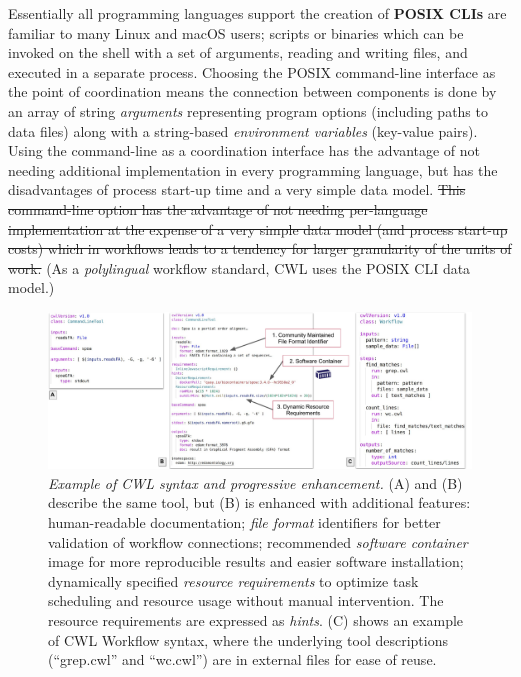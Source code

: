 \documentclass[sigconf,revew,screen,timestamp,nonacm]{acmart}
\newcommand{\addition}[1]{{\color{brown} #1}}
\newcommand{\deletion}[1]{{\color{red} \sout{#1}}}
\begin{document}
Essentially all programming languages support the creation of \textbf{POSIX CLIs} \addition{are familiar} to many Linux and macOS users; scripts or binaries which can be invoked on the shell with a set of arguments, reading and writing files, and executed in a separate process. Choosing the POSIX command-line interface as the point of coordination means the connection between components is done by an array of string \textit{arguments} representing program options (including paths to data files) along with a string-based \textit{environment variables} (key-value pairs). \addition{Using the command-line as a coordination interface has the advantage of not needing additional implementation in every programming language, but has the disadvantages of process start-up time and a very simple data model.} \deletion{This command-line option has the advantage of not needing per-language implementation at the expense of a very simple data model (and process start-up costs) which in workflows leads to a tendency for larger granularity of the units of work.} (As a \textit{polylingual} workflow standard, CWL uses the POSIX CLI data model.)

\begin{figure}
  \centering
  \includegraphics[width=\textwidth]{figure3b}
  \caption{\emph{Example of CWL syntax and progressive enhancement.} (A) and (B) describe the same tool, but (B) is enhanced with additional features:
  human-readable documentation;
  \textit{file format} identifiers \addition{for better}
  validation of workflow connections;
  recommended \textit{software container} image for more reproducible results and easier software installation;
  dynamically specified \textit{resource requirements} to optimize task scheduling and resource usage without manual intervention. The resource requirements are expressed as \textit{hints}. \addition{(C) shows an example of CWL Workflow syntax, where the underlying tool descriptions (``grep.cwl'' and ``wc.cwl'') are in external files for ease of reuse.}}
  \label{fig:syntax}
 \end{figure}
 
\end{document}
